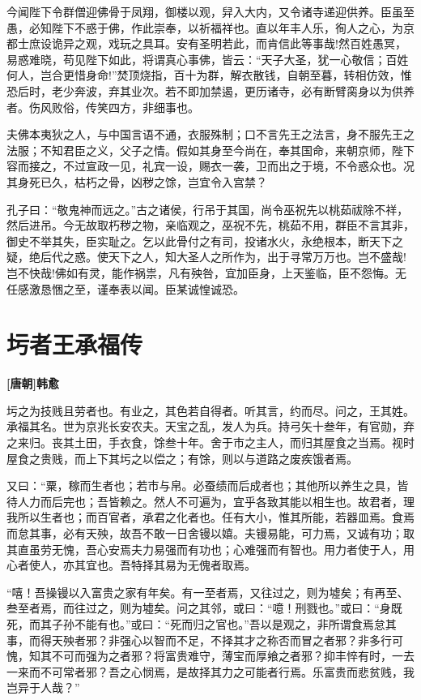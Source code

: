 \documentclass[UTF8,titlepage,oneside]{ctexbook}
\begin{document}
今闻陛下令群僧迎佛骨于凤翔，御楼以观，舁入大内，又令诸寺递迎供养。臣虽至愚，必知陛下不惑于佛，作此崇奉，以祈福祥也。直以年丰人乐，徇人之心，为京都士庶设诡异之观，戏玩之具耳。安有圣明若此，而肯信此等事哉!然百姓愚冥，易惑难晓，苟见陛下如此，将谓真心事佛，皆云：“天子大圣，犹一心敬信；百姓何人，岂合更惜身命!”焚顶烧指，百十为群，解衣散钱，自朝至暮，转相仿效，惟恐后时，老少奔波，弃其业次。若不即加禁遏，更历诸寺，必有断臂脔身以为供养者。伤风败俗，传笑四方，非细事也。

夫佛本夷狄之人，与中国言语不通，衣服殊制；口不言先王之法言，身不服先王之法服；不知君臣之义，父子之情。假如其身至今尚在，奉其国命，来朝京师，陛下容而接之，不过宣政一见，礼宾一设，赐衣一袭，卫而出之于境，不令惑众也。况其身死已久，枯朽之骨，凶秽之馀，岂宜令入宫禁？

孔子曰：“敬鬼神而远之。”古之诸侯，行吊于其国，尚令巫祝先以桃茹祓除不祥，然后进吊。今无故取朽秽之物，亲临观之，巫祝不先，桃茹不用，群臣不言其非，御史不举其失，臣实耻之。乞以此骨付之有司，投诸水火，永绝根本，断天下之疑，绝后代之惑。使天下之人，知大圣人之所作为，出于寻常万万也。岂不盛哉!岂不快哉!佛如有灵，能作祸祟，凡有殃咎，宜加臣身，上天鉴临，臣不怨悔。无任感激恳悃之至，谨奉表以闻。臣某诚惶诚恐。


\chapter*{圬者王承福传}
\begin{center}
	\textbf{[唐朝]韩愈}
\end{center}

圬之为技贱且劳者也。有业之，其色若自得者。听其言，约而尽。问之，王其姓。承福其名。世为京兆长安农夫。天宝之乱，发人为兵。持弓矢十叁年，有官勋，弃之来归。丧其土田，手衣食，馀叁十年。舍于市之主人，而归其屋食之当焉。视时屋食之贵贱，而上下其圬之以偿之；有馀，则以与道路之废疾饿者焉。

又曰：“粟，稼而生者也；若市与帛。必蚕绩而后成者也；其他所以养生之具，皆待人力而后完也；吾皆赖之。然人不可遍为，宜乎各致其能以相生也。故君者，理我所以生者也；而百官者，承君之化者也。任有大小，惟其所能，若器皿焉。食焉而怠其事，必有天殃，故吾不敢一日舍镘以嬉。夫镘易能，可力焉，又诚有功；取其直虽劳无愧，吾心安焉夫力易强而有功也；心难强而有智也。用力者使于人，用心者使人，亦其宜也。吾特择其易为无傀者取焉。

“嘻！吾操镘以入富贵之家有年矣。有一至者焉，又往过之，则为墟矣；有再至、叁至者焉，而往过之，则为墟矣。问之其邻，或曰：“噫！刑戮也。”或曰：“身既死，而其子孙不能有也。”或曰：“死而归之官也。”吾以是观之，非所谓食焉怠其事，而得天殃者邪？非强心以智而不足，不择其才之称否而冒之者邪？非多行可愧，知其不可而强为之者邪？将富贵难守，薄宝而厚飨之者邪？抑丰悴有时，一去一来而不可常者邪？吾之心悯焉，是故择其力之可能者行焉。乐富贵而悲贫贱，我岂异于人哉？”
\end{document}
